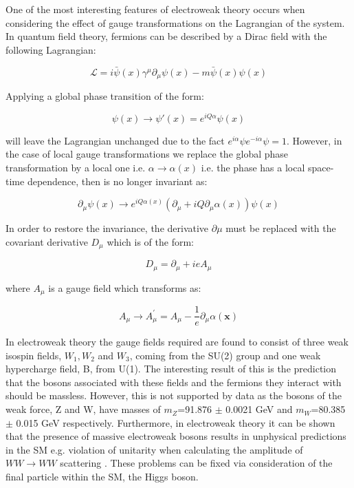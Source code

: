 One of the most interesting features of electroweak theory occurs when considering the effect of gauge transformations on the Lagrangian of the system. In quantum field theory, fermions can be described by a Dirac field with the following Lagrangian\cite{Pich:2005mk}:

\begin{equation}
  \label{eq:diracLagrangian}
\mathscr{L}=i\bar{\psi}(x) \gamma^{\mu} \partial{_\mu} \psi(x)  -m\bar{\psi}(x)\psi(x)
\end{equation}

Applying a global phase transition of the form:

\begin{equation}
\psi(x) \rightarrow \psi '(x) = e^{iQ\alpha}\psi(x)
\end{equation}

will leave the Lagrangian unchanged due to the fact $e^{i\alpha}\psi e^{-i\alpha}\psi=1$. However, in the case of local gauge transformations we replace the global phase transformation by a local one i.e. $\alpha \rightarrow\alpha(x) $ i.e. the phase has a local space-time dependence, then  is no longer invariant as:

\begin{equation}
  \partial{_\mu} \psi(x)\rightarrow e^{iQ\alpha(x)} (\partial{_\mu} + iQ\partial{_\mu}\alpha(x)) \psi(x)
\end{equation}

In order to restore the invariance, the derivative $\partial{\mu}$ must be replaced with the covariant derivative $D_{\mu}$ which is of the form:

\begin{equation}
  D_{\mu}=\partial{_\mu}+ieA_{\mu}
\end{equation}

where $A_{\mu}$ is a gauge field which transforms as:

\begin{equation}
  A_{\mu}\rightarrow A_{\mu}^{'} = A_{\mu} - \frac{1}{e}\partial{_\mu}\alpha(\textbf{x})
\end{equation}

In electroweak theory the gauge fields required are found to consist of three weak isospin fields, $W_1, W_2$ and $W_3$,  coming from the SU(2) group and one weak hypercharge field, B, from U(1). The interesting result of this is the prediction that the bosons associated with these fields and the fermions they interact with should be massless. However, this is not supported by data as the bosons of the weak force, Z and W, have masses of $m_Z$=91.876 $\pm$ 0.0021 GeV and $m_W$=80.385 $\pm$ 0.015 GeV respectively\cite{Patrignani:2016xqp}. Furthermore, in electroweak theory it can be shown that the presence of massive electroweak bosons results in unphysical predictions in the \ac{SM} e.g. violation of unitarity when calculating the amplitude of $WW\rightarrow WW$ scattering \cite{Szleper:2014xxa}. These problems can be fixed via consideration of the final particle within the \ac{SM}, the Higgs boson.

